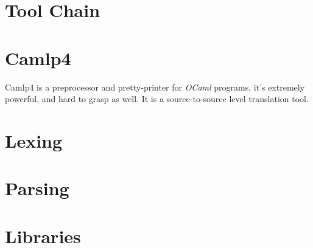 \documentclass[svgnames,12pt,a4paper]{book}
\begin{document}
\newpage

\tableofcontents
\listoftodos
\vspace*{1cm}

\newpage
\newpage 
\chapter{Tool Chain}
 

















\chapter{Camlp4}
\label{sec:camlp4}
Camlp4 is a preprocessor and pretty-printer for \textit{OCaml}
programs, it's extremely powerful, and hard to grasp as well. It is a
source-to-source level translation tool.
  
  
  
  
  
  
  
  
  
  

  
  
  
  
  

\chapter{Lexing}



\chapter{Parsing}
\label{sec:ocamlyacc}


  
\chapter{Libraries}
  
  
\end{document}
